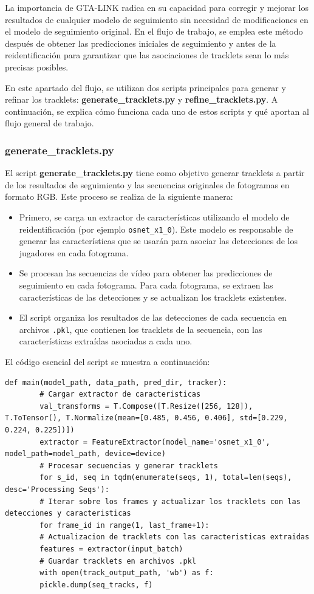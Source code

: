 \documentclass[12pt, a4paper, twoside]{article}
\begin{document}
	La importancia de GTA-LINK radica en su capacidad para corregir y mejorar los resultados de cualquier modelo de seguimiento sin necesidad de modificaciones en el modelo de seguimiento original. En el flujo de trabajo, se emplea este método después de obtener las predicciones iniciales de seguimiento y antes de la reidentificación para garantizar que las asociaciones de tracklets sean lo más precisas posibles.
	
	
	En este apartado del flujo, se utilizan dos scripts principales para generar y refinar los tracklets: \textbf{generate\_tracklets.py} y \textbf{refine\_tracklets.py}. A continuación, se explica cómo funciona cada uno de estos scripts y qué aportan al flujo general de trabajo.
	
	\subsubsection{generate\_tracklets.py}
	
	El script \textbf{generate\_tracklets.py} tiene como objetivo generar tracklets a partir de los resultados de seguimiento y las secuencias originales de fotogramas en formato RGB. Este proceso se realiza de la siguiente manera:
	
	\begin{itemize}
		\item Primero, se carga un extractor de características utilizando el modelo de reidentificación (por ejemplo \texttt{osnet\_x1\_0}). Este modelo es responsable de generar las características que se usarán para asociar las detecciones de los jugadores en cada fotograma.
		\item Se procesan las secuencias de vídeo para obtener las predicciones de seguimiento en cada fotograma. Para cada fotograma, se extraen las características de las detecciones y se actualizan los tracklets existentes.
		\item El script organiza los resultados de las detecciones de cada secuencia en archivos \texttt{.pkl}, que contienen los tracklets de la secuencia, con las características extraídas asociadas a cada uno.
	\end{itemize}
	
	El código esencial del script se muestra a continuación:
	
	\begin{lstlisting}[style=pythonstyle]
		def main(model_path, data_path, pred_dir, tracker):
		# Cargar extractor de caracteristicas
		val_transforms = T.Compose([T.Resize([256, 128]), T.ToTensor(), T.Normalize(mean=[0.485, 0.456, 0.406], std=[0.229, 0.224, 0.225])])
		extractor = FeatureExtractor(model_name='osnet_x1_0', model_path=model_path, device=device)
		# Procesar secuencias y generar tracklets
		for s_id, seq in tqdm(enumerate(seqs, 1), total=len(seqs), desc='Processing Seqs'):
		# Iterar sobre los frames y actualizar los tracklets con las detecciones y caracteristicas
		for frame_id in range(1, last_frame+1):
		# Actualizacion de tracklets con las caracteristicas extraidas
		features = extractor(input_batch)
		# Guardar tracklets en archivos .pkl
		with open(track_output_path, 'wb') as f:
		pickle.dump(seq_tracks, f)
	\end{lstlisting}
	
\end{document}
